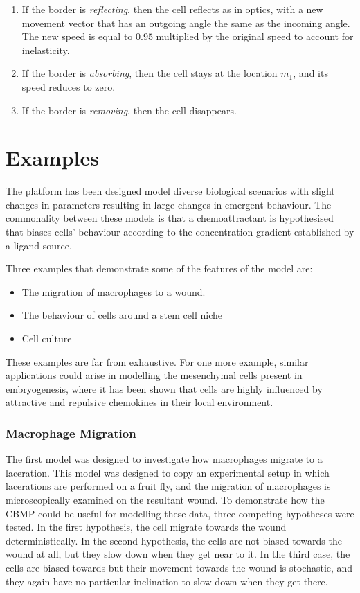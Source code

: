 \documentclass[12pt]{article}
\begin{document}
\begin{enumerate}
  \item If the border is {\itshape reflecting}, then the cell reflects as in optics, 
with a new movement vector that has an outgoing angle the same as the 
incoming angle. The new speed is equal to \(0.95\) multiplied by the original speed
to account for inelasticity.
\item If the border is {\itshape absorbing}, then the cell stays at the location \(m_1\), 
  and its speed reduces to zero.
\item If the border is {\itshape removing}, then the cell disappears.
\end{enumerate}

\section{Examples}
The platform has been designed model diverse biological scenarios with 
slight changes in parameters resulting in large changes in emergent 
behaviour. The commonality between these models is that a 
chemoattractant is hypothesised that biases cells' behaviour according 
to the concentration gradient established by a ligand source.

Three examples that demonstrate some of the features of the model are:

\begin{itemize}
\item The migration of macrophages to a wound.
\item The behaviour of cells around a stem cell niche
\item Cell culture
\end{itemize}

These examples are far from exhaustive. For one more example, similar 
applications could arise in modelling the mesenchymal cells present in 
embryogenesis,\cite{caplan91} where it has been shown that cells are highly influenced 
by attractive and repulsive chemokines in their local environment.

\subsubsection{Macrophage Migration}
The first model was designed to investigate how macrophages migrate to a 
laceration. This model was designed to copy an experimental setup in 
which lacerations are performed on a fruit fly, and the migration of 
macrophages is microscopically examined on the resultant wound. To 
demonstrate how the CBMP could be useful for modelling these data, three 
competing hypotheses were tested. In the first hypothesis, the cell 
migrate towards the wound deterministically. In the second hypothesis, 
the cells are not biased towards the wound at all, but they slow down 
when they get near to it. In the third case, the cells are biased 
towards but their movement towards the wound is stochastic, and they 
again have no particular inclination to slow down when they get there.
\end{document}
